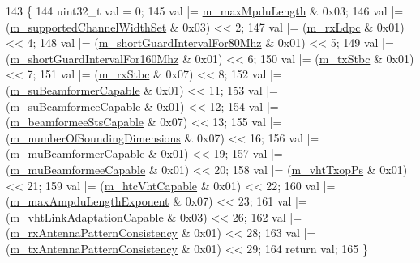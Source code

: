 \begin{DoxyCode}
143 \{
144   uint32\_t val = 0;
145   val |= \hyperlink{classns3_1_1VhtCapabilities_a50f9372914daf48375359a4159cd3ad0}{m\_maxMpduLength} & 0x03;
146   val |= (\hyperlink{classns3_1_1VhtCapabilities_a5beb0948abe32fd1b77317b6057d1639}{m\_supportedChannelWidthSet} & 0x03) << 2;
147   val |= (\hyperlink{classns3_1_1VhtCapabilities_ac7538c76efb246f9c076a69d605c8d65}{m\_rxLdpc} & 0x01) << 4;
148   val |= (\hyperlink{classns3_1_1VhtCapabilities_a17def5a3281c3fbecb315a9f0ccc2d8d}{m\_shortGuardIntervalFor80Mhz} & 0x01) << 5;
149   val |= (\hyperlink{classns3_1_1VhtCapabilities_aaaba1407325ab2e1eb5d0a063058e6e4}{m\_shortGuardIntervalFor160Mhz} & 0x01) << 6;
150   val |= (\hyperlink{classns3_1_1VhtCapabilities_a67911a0a1dbc994b8b9c79567cc1059b}{m\_txStbc} & 0x01) << 7;
151   val |= (\hyperlink{classns3_1_1VhtCapabilities_a6dccb436c32dda6ccbdbaf67928cdece}{m\_rxStbc} & 0x07) << 8;
152   val |= (\hyperlink{classns3_1_1VhtCapabilities_a6c6a15832cd47a4c9e48f93edad69b27}{m\_suBeamformerCapable} & 0x01) << 11;
153   val |= (\hyperlink{classns3_1_1VhtCapabilities_aabc73c23623e50a9dba2dfaadf31befa}{m\_suBeamformeeCapable} & 0x01) << 12;
154   val |= (\hyperlink{classns3_1_1VhtCapabilities_aaecf70161e31da3bd6bda12f92bf3ac9}{m\_beamformeeStsCapable} & 0x07) << 13;
155   val |= (\hyperlink{classns3_1_1VhtCapabilities_adc25185f388e5c4ee9ea95e226d2d19d}{m\_numberOfSoundingDimensions} & 0x07) << 16;
156   val |= (\hyperlink{classns3_1_1VhtCapabilities_a436c61de355e9140334b068c001cabde}{m\_muBeamformerCapable} & 0x01) << 19;
157   val |= (\hyperlink{classns3_1_1VhtCapabilities_a4ad315b53baa57cf62dccd0505107f36}{m\_muBeamformeeCapable} & 0x01) << 20;
158   val |= (\hyperlink{classns3_1_1VhtCapabilities_a65e925626af356b9b272e673921ca919}{m\_vhtTxopPs} & 0x01) << 21;
159   val |= (\hyperlink{classns3_1_1VhtCapabilities_a026afef6660a4220b432ec4f1cefcd58}{m\_htcVhtCapable} & 0x01) << 22;
160   val |= (\hyperlink{classns3_1_1VhtCapabilities_aef0f011be7c0aa3224d22a93dfc5cc22}{m\_maxAmpduLengthExponent} & 0x07) << 23;
161   val |= (\hyperlink{classns3_1_1VhtCapabilities_a271c69d342916c0dbd34e4847a7373a2}{m\_vhtLinkAdaptationCapable} & 0x03) << 26;
162   val |= (\hyperlink{classns3_1_1VhtCapabilities_abfe153a6daae103951c55c3f33d34886}{m\_rxAntennaPatternConsistency} & 0x01) << 28;
163   val |= (\hyperlink{classns3_1_1VhtCapabilities_ad4e0ac2f77ac2c5d8e9e344d36492110}{m\_txAntennaPatternConsistency} & 0x01) << 29;
164   \textcolor{keywordflow}{return} val;
165 \}
\end{DoxyCode}


